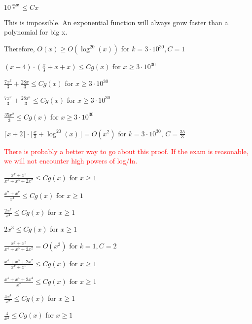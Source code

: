 \documentclass{exam}
\begin{document}
\begin{questions}
\begin{subparts}
\begin{center}
\(10^{\sqrt[20]{x}} \leq Cx\)

This is impossible. An exponential function will always grow faster than a polynomial for big x.

Therefore, \(O(x) \geq O(\log^{20}(x))\) for \(k = 3 \cdot 10^{30}, C = 1\)

\( (x + 4) \cdot (\frac{x}{3} + x + x) \leq Cg(x)\) for \(x \geq 3 \cdot 10^{30}\)

\( \frac{7x^2}{3} + \frac{28x}{3} \leq Cg(x)\) for \(x \geq 3 \cdot 10^{30}\)

\( \frac{7x^2}{3} + \frac{28x^2}{3} \leq Cg(x)\) for \(x \geq 3 \cdot 10^{30}\)

\( \frac{35x^2}{3} \leq Cg(x)\) for \(x \geq 3 \cdot 10^{30}\)

\( \lceil x + 2 \rceil \cdot \lfloor \frac{x}{3} + \log^{20}(x) \rfloor = O(x^2)\) for \(k = 3\cdot10^{30}\), \(C = \frac{35}{3}\)

\textcolor{red}{There is probably a better way to go about this proof. If the exam is reasonable, we will not encounter high powers of log/ln.}

\end{center}


\begin{center}

\( \frac{x^7 + x^5}{x^4 + x^3 + 2x^2} \leq Cg(x)\) for \(x \geq 1\)

\( \frac{x^7 + x^7}{x^4} \leq Cg(x)\) for \(x \geq 1\)

\( \frac{2x^7}{x^4} \leq Cg(x)\) for \(x \geq 1\)

\( 2x^3 \leq Cg(x)\) for \(x \geq 1\)

\( \frac{x^7 + x^5}{x^4 + x^3 + 2x^2} = O(x^3)\) for \(k = 1, C = 2\)

\end{center}


\begin{center}

\( \frac{x^4 + x^3 + 2x^2}{x^7 + x^5} \leq Cg(x)\) for \(x \geq 1\)

\( \frac{x^4 + x^4 + 2x^4}{x^7} \leq Cg(x)\) for \(x \geq 1\)

\( \frac{4x^4}{x^7} \leq Cg(x)\) for \(x \geq 1\)

\( \frac{4}{x^3} \leq Cg(x)\) for \(x \geq 1\)


\end{center}
\end{subparts}
\end{questions}
\end{document}
